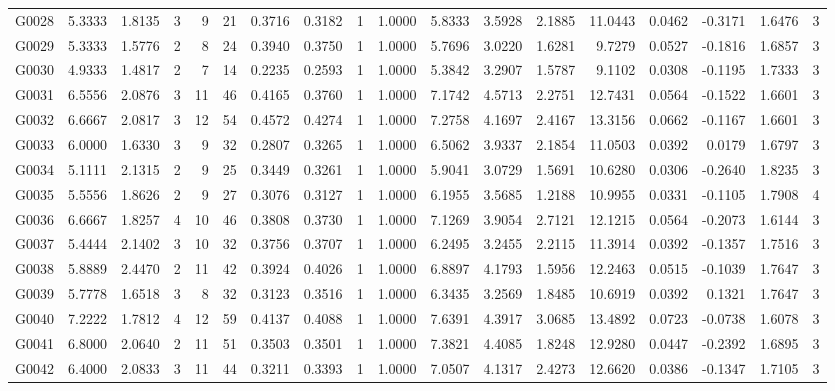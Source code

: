 \begin{tabular}{lrrrrrrrrrrrrrrrrr}
G0028 & 5.3333 & 1.8135 & 3 & 9 & 21 & 0.3716 & 0.3182 & 1 & 1.0000 & 5.8333 & 3.5928 & 2.1885 & 11.0443 & 0.0462 & -0.3171 & 1.6476 & 3 \\
G0029 & 5.3333 & 1.5776 & 2 & 8 & 24 & 0.3940 & 0.3750 & 1 & 1.0000 & 5.7696 & 3.0220 & 1.6281 & 9.7279 & 0.0527 & -0.1816 & 1.6857 & 3 \\
G0030 & 4.9333 & 1.4817 & 2 & 7 & 14 & 0.2235 & 0.2593 & 1 & 1.0000 & 5.3842 & 3.2907 & 1.5787 & 9.1102 & 0.0308 & -0.1195 & 1.7333 & 3 \\
G0031 & 6.5556 & 2.0876 & 3 & 11 & 46 & 0.4165 & 0.3760 & 1 & 1.0000 & 7.1742 & 4.5713 & 2.2751 & 12.7431 & 0.0564 & -0.1522 & 1.6601 & 3 \\
G0032 & 6.6667 & 2.0817 & 3 & 12 & 54 & 0.4572 & 0.4274 & 1 & 1.0000 & 7.2758 & 4.1697 & 2.4167 & 13.3156 & 0.0662 & -0.1167 & 1.6601 & 3 \\
G0033 & 6.0000 & 1.6330 & 3 & 9 & 32 & 0.2807 & 0.3265 & 1 & 1.0000 & 6.5062 & 3.9337 & 2.1854 & 11.0503 & 0.0392 & 0.0179 & 1.6797 & 3 \\
G0034 & 5.1111 & 2.1315 & 2 & 9 & 25 & 0.3449 & 0.3261 & 1 & 1.0000 & 5.9041 & 3.0729 & 1.5691 & 10.6280 & 0.0306 & -0.2640 & 1.8235 & 3 \\
G0035 & 5.5556 & 1.8626 & 2 & 9 & 27 & 0.3076 & 0.3127 & 1 & 1.0000 & 6.1955 & 3.5685 & 1.2188 & 10.9955 & 0.0331 & -0.1105 & 1.7908 & 4 \\
G0036 & 6.6667 & 1.8257 & 4 & 10 & 46 & 0.3808 & 0.3730 & 1 & 1.0000 & 7.1269 & 3.9054 & 2.7121 & 12.1215 & 0.0564 & -0.2073 & 1.6144 & 3 \\
G0037 & 5.4444 & 2.1402 & 3 & 10 & 32 & 0.3756 & 0.3707 & 1 & 1.0000 & 6.2495 & 3.2455 & 2.2115 & 11.3914 & 0.0392 & -0.1357 & 1.7516 & 3 \\
G0038 & 5.8889 & 2.4470 & 2 & 11 & 42 & 0.3924 & 0.4026 & 1 & 1.0000 & 6.8897 & 4.1793 & 1.5956 & 12.2463 & 0.0515 & -0.1039 & 1.7647 & 3 \\
G0039 & 5.7778 & 1.6518 & 3 & 8 & 32 & 0.3123 & 0.3516 & 1 & 1.0000 & 6.3435 & 3.2569 & 1.8485 & 10.6919 & 0.0392 & 0.1321 & 1.7647 & 3 \\
G0040 & 7.2222 & 1.7812 & 4 & 12 & 59 & 0.4137 & 0.4088 & 1 & 1.0000 & 7.6391 & 4.3917 & 3.0685 & 13.4892 & 0.0723 & -0.0738 & 1.6078 & 3 \\
G0041 & 6.8000 & 2.0640 & 2 & 11 & 51 & 0.3503 & 0.3501 & 1 & 1.0000 & 7.3821 & 4.4085 & 1.8248 & 12.9280 & 0.0447 & -0.2392 & 1.6895 & 3 \\
G0042 & 6.4000 & 2.0833 & 3 & 11 & 44 & 0.3211 & 0.3393 & 1 & 1.0000 & 7.0507 & 4.1317 & 2.4273 & 12.6620 & 0.0386 & -0.1347 & 1.7105 & 3 \\

\end{tabular}
